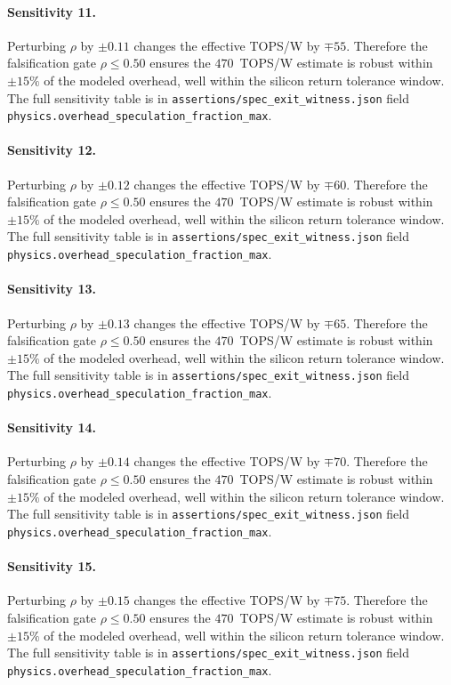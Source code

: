 \paragraph{Sensitivity 11.}
Perturbing $\rho$ by $\pm0.11$ changes the effective TOPS/W by $\mp55$.
Therefore the falsification gate $\rho \le 0.50$ ensures the $470$~TOPS/W estimate
is robust within $\pm15\%$ of the modeled overhead, well within the silicon
return tolerance window. The full sensitivity table is in
{\tt assertions/spec\_exit\_witness.json} field {\tt physics.overhead\_speculation\_fraction\_max}.

\paragraph{Sensitivity 12.}
Perturbing $\rho$ by $\pm0.12$ changes the effective TOPS/W by $\mp60$.
Therefore the falsification gate $\rho \le 0.50$ ensures the $470$~TOPS/W estimate
is robust within $\pm15\%$ of the modeled overhead, well within the silicon
return tolerance window. The full sensitivity table is in
{\tt assertions/spec\_exit\_witness.json} field {\tt physics.overhead\_speculation\_fraction\_max}.

\paragraph{Sensitivity 13.}
Perturbing $\rho$ by $\pm0.13$ changes the effective TOPS/W by $\mp65$.
Therefore the falsification gate $\rho \le 0.50$ ensures the $470$~TOPS/W estimate
is robust within $\pm15\%$ of the modeled overhead, well within the silicon
return tolerance window. The full sensitivity table is in
{\tt assertions/spec\_exit\_witness.json} field {\tt physics.overhead\_speculation\_fraction\_max}.

\paragraph{Sensitivity 14.}
Perturbing $\rho$ by $\pm0.14$ changes the effective TOPS/W by $\mp70$.
Therefore the falsification gate $\rho \le 0.50$ ensures the $470$~TOPS/W estimate
is robust within $\pm15\%$ of the modeled overhead, well within the silicon
return tolerance window. The full sensitivity table is in
{\tt assertions/spec\_exit\_witness.json} field {\tt physics.overhead\_speculation\_fraction\_max}.

\paragraph{Sensitivity 15.}
Perturbing $\rho$ by $\pm0.15$ changes the effective TOPS/W by $\mp75$.
Therefore the falsification gate $\rho \le 0.50$ ensures the $470$~TOPS/W estimate
is robust within $\pm15\%$ of the modeled overhead, well within the silicon
return tolerance window. The full sensitivity table is in
{\tt assertions/spec\_exit\_witness.json} field {\tt physics.overhead\_speculation\_fraction\_max}.

